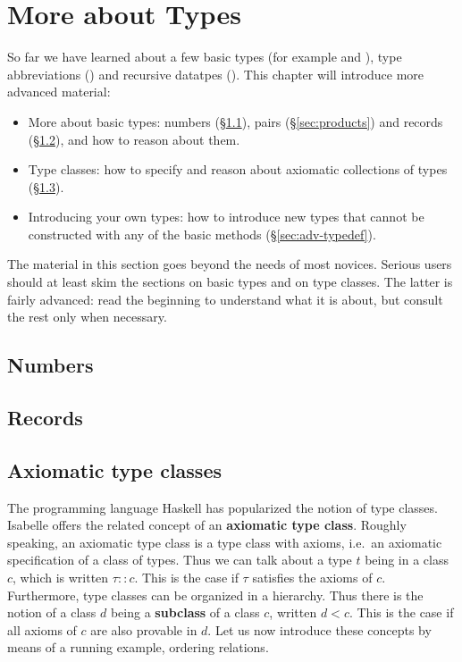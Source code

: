 \chapter{More about Types}
\label{ch:more-types}

So far we have learned about a few basic types (for example  and
), type abbreviations () and recursive datatpes
(). This chapter will introduce more
advanced material:
\begin{itemize}
\item More about basic types: numbers ({\S}\ref{sec:numbers}), pairs
  ({\S}\ref{sec:products}) and records ({\S}\ref{sec:records}), and how to
  reason about them.
\item Type classes: how to specify and reason about axiomatic collections of
  types ({\S}\ref{sec:axclass}).
\item Introducing your own types: how to introduce new types that
  cannot be constructed with any of the basic methods
  ({\S}\ref{sec:adv-typedef}).
\end{itemize}

The material in this section goes beyond the needs of most novices.  Serious
users should at least skim the sections on basic types and on type classes.
The latter is fairly advanced: read the beginning to understand what it is
about, but consult the rest only when necessary.

\section{Numbers}
\label{sec:numbers}





\section{Records}
\label{sec:records}

\section{Axiomatic type classes}
\label{sec:axclass}


The programming language Haskell has popularized the notion of type classes.
Isabelle offers the related concept of an \textbf{axiomatic type class}.
Roughly speaking, an axiomatic type class is a type class with axioms, i.e.\ 
an axiomatic specification of a class of types. Thus we can talk about a type
$t$ being in a class $c$, which is written $\tau :: c$.  This is the case if
$\tau$ satisfies the axioms of $c$. Furthermore, type classes can be
organized in a hierarchy. Thus there is the notion of a class $d$ being a
\textbf{subclass} of a class $c$, written $d < c$. This is the case if all
axioms of $c$ are also provable in $d$. Let us now introduce these concepts
by means of a running example, ordering relations.

